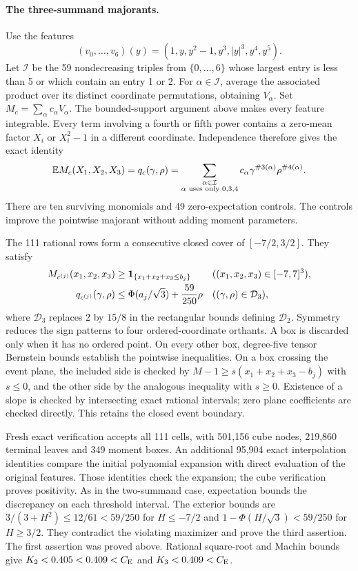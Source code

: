 \paragraph{The three-summand majorants.}
Use the features
\[
 (v_0,\ldots,v_6)(y)=(1,y,y^2-1,y^3,|y|^3,y^4,y^5).
\]
Let $\mathcal I$ be the 59 nondecreasing triples from $\{0,\ldots,6\}$
whose largest entry is less than 5 or which contain an entry 1 or 2.
For $\alpha\in\mathcal I$, average the associated product over its
distinct coordinate permutations, obtaining $V_\alpha$.
Set $M_c=\sum_\alpha c_\alpha V_\alpha$.
The bounded-support argument above makes every feature integrable.
Every term involving a fourth or fifth power contains a zero-mean
factor $X_i$ or $X_i^2-1$ in a different coordinate.  Independence
therefore gives the exact identity
\[
 \mathbb E M_c(X_1,X_2,X_3)=q_c(\gamma,\rho)
 =\sum_{\substack{\alpha\in\mathcal I\\\alpha\text{ uses only }0,3,4}}
     c_\alpha\gamma^{\#3(\alpha)}\rho^{\#4(\alpha)}.
\]
There are ten surviving monomials and 49 zero-expectation controls.
The controls improve the pointwise majorant without adding moment
parameters.

The 111 rational rows form a consecutive closed cover of
$[-7/2,3/2]$.  They satisfy
\begin{align*}
 M_{c^{(j)}}(x_1,x_2,x_3)&\ge\mathbf 1_{\{x_1+x_2+x_3\le b_j\}}
                    &&((x_1,x_2,x_3)\in[-7,7]^3),\\
 q_{c^{(j)}}(\gamma,\rho)&\le\Phi(a_j/\sqrt3)+\frac{59}{250}\rho
                    &&((\gamma,\rho)\in\mathcal D_3),
\end{align*}
where $\mathcal D_3$ replaces $2$ by $15/8$ in the rectangular
bounds defining $\mathcal D_2$.
Symmetry reduces the sign patterns to four ordered-coordinate
orthants.  A box is discarded only when it has no ordered point.
On every other box, degree-five tensor Bernstein bounds establish
the pointwise inequalities.  On a box crossing the event plane,
the included side is checked by $M-1\ge s(x_1+x_2+x_3-b_j)$ with
$s\le0$, and the other side by the analogous inequality with $s\ge0$.
Existence of a slope is checked by intersecting exact rational intervals;
zero plane coefficients are checked directly.  This retains the closed
event boundary.

Fresh exact verification accepts all 111 cells, with 501,156 cube
nodes, 219,860 terminal leaves and 349 moment boxes.  An additional
95,904 exact interpolation identities compare the initial polynomial
expansion with direct evaluation of the original features.  Those
identities check the expansion; the cube verification proves positivity.
As in the two-summand case, expectation bounds the discrepancy on each
threshold interval.  The exterior bounds are
$3/(3+H^2)\le12/61<59/250$ for $H\le-7/2$ and
$1-\Phi(H/\sqrt3)<59/250$ for $H\ge3/2$.
They contradict the violating maximizer and prove the third assertion.
The first assertion was proved above.  Rational square-root and Machin
bounds give $K_2<0.405<0.409<C_{\mathrm E}$ and $K_3<0.409<C_{\mathrm E}$.


